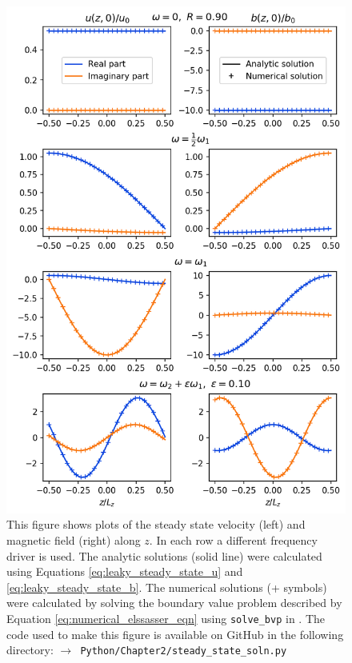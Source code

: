\begin{figure}
    \centering
    \vspace{-20pt}
    \includegraphics[width=\textwidth,height=0.85\textheight,keepaspectratio]{figures/chapter02/steady_state_soln_along_z.png}
    \vspace{-10pt}
    \caption{This figure shows plots of the steady state velocity (left) and magnetic field (right) along $z$. In each row a different frequency driver is used. The analytic solutions (solid line) were calculated using Equations \eqref{eq:leaky_steady_state_u} and \eqref{eq:leaky_steady_state_b}. The numerical solutions (+ symbols) were calculated by solving the boundary value problem described by Equation \eqref{eq:numerical_elssasser_eqn} using \texttt{solve\_bvp} in \citet{SciPy2020}. The code used to make this figure is available on GitHub in the following directory:\newline
    \texttt{$\rightarrow$ Python/Chapter2/steady\_state\_soln.py}}
    \vspace{-30pt}
    \label{fig:steady_state_soln_along_z}
\end{figure}

